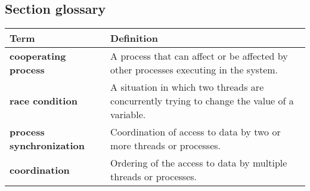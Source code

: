 \subsection{Section glossary}
\centering
\begin{tabular}{>{\raggedright}p{} >{\raggedright\arraybackslash}p{}}
\toprule
\textbf{Term} & \textbf{Definition} \\
\midrule
\textbf{cooperating process} & A process that can affect or be affected by other processes executing in the system. \\
\textbf{race condition} & A situation in which two threads are concurrently trying to change the value of a variable. \\
\textbf{process synchronization} & Coordination of access to data by two or more threads or processes. \\
\textbf{coordination} & Ordering of the access to data by multiple threads or processes. \\
\bottomrule
\end{tabular}
\vspace{\baselineskip}
